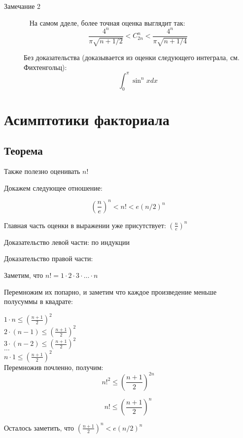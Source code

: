 \begin{description}
\item[Замечание 2] ~
На самом дделе, более точная оценка выглядит так:
$$
\frac{4^n}{\pi \sqrt{n+1/2}} < C_{2n}^{n} < \frac{4^n}{\pi \sqrt{n+1/4}}
$$

Без доказательства (доказывается из оценки следующего интеграла, см. Фихтенгольц):
$$
\int_0^{\pi} \sin^n{x} dx
$$

\end{description}


\section{Асимптотики факториала}

\subsection{Теорема}

Также полезно оценивать $ n! $

Докажем следующее отношение:

\begin{equation}
\label{factor1}
\left( \frac{n}{e} \right)^n < n! < e (n/2)^n 
\end{equation}



Главная часть оценки в выражении уже присутствует: $ \left( \frac{n}{e} \right)^n $

Доказательство левой части: по индукции

Доказательство правой части:

Заметим, что $ n! = 1 \cdot 2 \cdot 3 \cdot \ldots \cdot n $

Перемножим их попарно, и заметим что каждое произведение меньше полусуммы в квадрате:

$ 1 \cdot n  \le \left(  \frac{n+1}{2} \right)^2 $	\\
$ 2 \cdot (n-1) \le \left(  \frac{n+1}{2} \right)^2 $ 	\\
$ 3 \cdot (n-2) \le\left(  \frac{n+1}{2} \right)^2 $	\\
$ \ldots $\\
$ n \cdot 1 \le \left(  \frac{n+1}{2} \right)^2$	\\

Перемножив почленно, получим:
$$
n!^{2}  \le \left(  \frac{n+1}{2} \right)^{2n} 
$$

$$
n!  \le \left(  \frac{n+1}{2} \right)^{n} 
$$

Осталось заметить, что $ \left(  \frac{n+1}{2} \right)^{n} <  e (n/2)^n $


